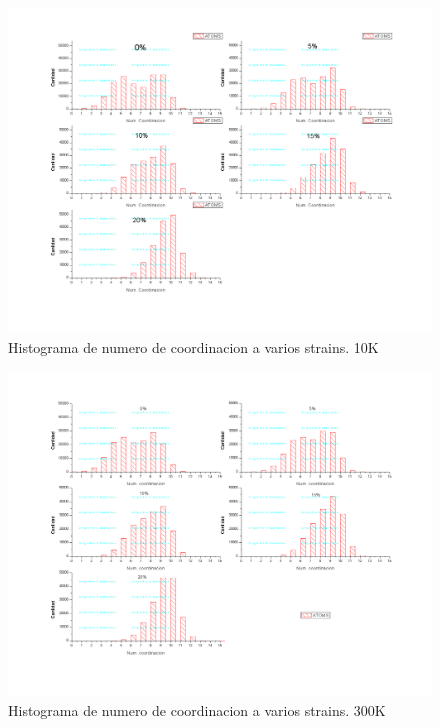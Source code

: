 \documentclass[10pt, oneside]{article} %
\begin{document}
\begin{figure}[H]
\centering
\includegraphics[width=16cm]{Figures/10-HistogramaCoord_COMP.png}
\caption{Histograma de numero de coordinacion a varios strains. 10K}
\end{figure}

\begin{figure}[H]
\centering
\includegraphics[width=16cm]{Figures/300-HistogramaCoord_COMP.png}
\caption{Histograma de numero de coordinacion a varios strains. 300K}
\end{figure}
\end{document}
